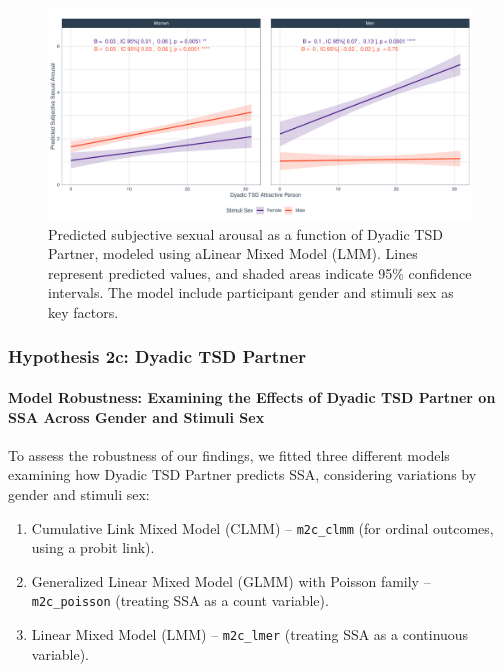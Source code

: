 \documentclass[
  bookmarksnumbered]{article}
\providecommand{\tightlist}{%
  \setlength{\itemsep}{0pt}\setlength{\parskip}{0pt}}
\begin{document}
\begin{figure}
\centering
\includegraphics{Sexual_Desire_Arousal_files/figure-latex/fig-h2b-1.pdf}
\caption{\label{fig:fig-h2b}Predicted subjective sexual arousal as a function of Dyadic TSD Partner, modeled using aLinear Mixed Model (LMM). Lines represent predicted values, and shaded areas indicate 95\% confidence intervals. The model include participant gender and stimuli sex as key factors.}
\end{figure}

\subsubsection{Hypothesis 2c: Dyadic TSD Partner}\label{hyp2c}

\paragraph{Model Robustness: Examining the Effects of Dyadic TSD Partner on SSA Across Gender and Stimuli Sex}\label{model-robustness-examining-the-effects-of-dyadic-tsd-partner-on-ssa-across-gender-and-stimuli-sex}

To assess the robustness of our findings, we fitted three different models examining how Dyadic TSD Partner predicts SSA, considering variations by gender and stimuli sex:

\begin{enumerate}
\def\labelenumi{\arabic{enumi}.}
\tightlist
\item
  Cumulative Link Mixed Model (CLMM) -- \texttt{m2c\_clmm} (for ordinal outcomes, using a probit link).
\item
  Generalized Linear Mixed Model (GLMM) with Poisson family -- \texttt{m2c\_poisson} (treating SSA as a count variable).
\item
  Linear Mixed Model (LMM) -- \texttt{m2c\_lmer} (treating SSA as a continuous variable).
\end{enumerate}
\end{document}
